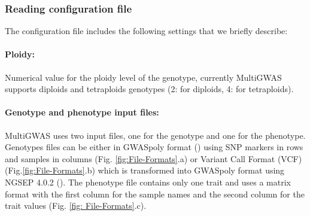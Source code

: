 \documentclass{article}
\begin{document}

\subsubsection{Reading configuration file\label{section-Reading-configuration-file}}

The configuration file includes the following settings that we briefly describe:%

\paragraph{{Ploidy:}} Numerical value for the ploidy level of the genotype, currently MultiGWAS supports diploids and tetraploids genotypes (2: for diploids, 4: for tetraploids).

\paragraph{{Genotype and phenotype input files:}}

MultiGWAS uses two input files, one for the genotype and one for the phenotype. Genotypes files can be either in GWASpoly format (\cite{Rosyara2016}) using SNP markers in rows and samples in columns (Fig. \ref{fig:File-Formats}.a) or Variant Call Format (VCF) (Fig.\ref{fig:File-Formats}.b) which is transformed into GWASpoly format using NGSEP 4.0.2 (\cite{Duitama2019}). The phenotype file contains only one trait and uses a matrix format with the first column for the sample names and the second column for the trait values (Fig. \ref{fig: File-Formats}.c).
\end{document}
